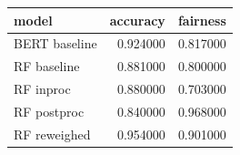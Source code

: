 \begin{tabular}{lrr}
\toprule
model & accuracy & fairness \\
\midrule
BERT baseline & 0.924000 & 0.817000 \\
RF baseline & 0.881000 & 0.800000 \\
RF inproc & 0.880000 & 0.703000 \\
RF postproc & 0.840000 & 0.968000 \\
RF reweighed & 0.954000 & 0.901000 \\
\bottomrule
\end{tabular}
